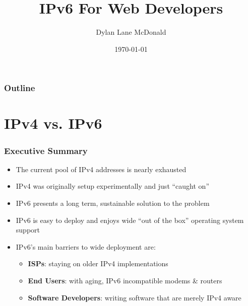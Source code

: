 \documentclass[aspectratio=169]{beamer}
\title{IPv6 For Web Developers}
\author{Dylan Lane McDonald}
\institute{CNM STEMulus Center\\Web Development with PHP}
\date{\today}
\begin{document}
\lstset{language=Java}
\begin{frame}
\titlepage
\end{frame}

\begin{frame}
\frametitle{Outline}
\tableofcontents
\end{frame}

\section{IPv4 vs. IPv6}
\begin{frame}
\frametitle{Executive Summary}
\begin{itemize}
	\item The current pool of IPv4 addresses is nearly exhausted
	\pause
	\item IPv4 was originally setup experimentally and just ``caught on''
	\pause
	\item IPv6 presents a long term, sustainable solution to the problem
	\pause
	\item IPv6 is easy to deploy and enjoys wide ``out of the box'' operating system support
	\pause
	\item IPv6's main barriers to wide deployment are:
	\begin{itemize}
		\pause
		\item \textbf{ISPs}: staying on older IPv4 implementations
		\pause
		\item \textbf{End Users}: with aging, IPv6 incompatible modems \& routers
		\pause
		\item \textbf{Software Developers}: writing software that are merely IPv4 aware
	\end{itemize}
\end{itemize}
\end{frame}
\end{document}
